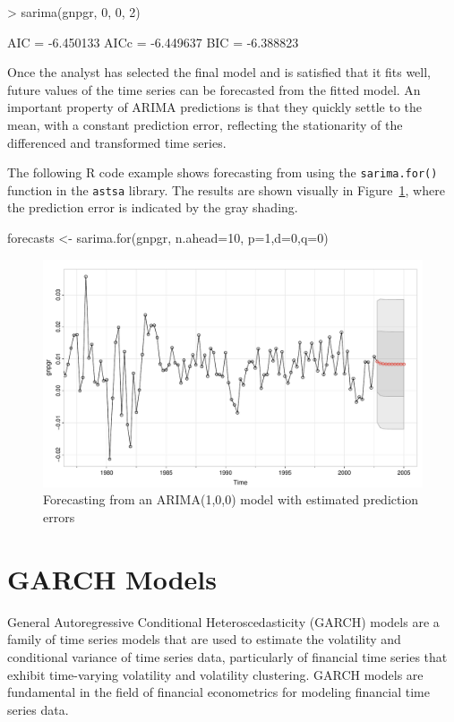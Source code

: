 \begin{samepage}
\begin{textcode}
> sarima(gnpgr, 0, 0, 2)

AIC = -6.450133  AICc = -6.449637  BIC = -6.388823 
\end{textcode}
\end{samepage}

Once the analyst has selected the final model and is satisfied that it fits well, future values of the time series can be forecasted from the fitted model. An important property of ARIMA predictions is that they quickly settle to the mean, with a constant prediction error, reflecting the stationarity of the differenced and transformed time series.

The following R code example shows forecasting from using the \texttt{sarima.for()} function in the \texttt{astsa} library. The results are shown visually in Figure~\ref{fig:figure21}, where the prediction error is indicated by the gray shading.

\begin{Rcode}
forecasts <- sarima.for(gnpgr, n.ahead=10, p=1,d=0,q=0)
\end{Rcode}

\begin{figure}
\centering
\includegraphics[width=.75\textwidth]{figure21.pdf}
\caption[Forecasting from an ARIMA(1,0,0) model]{Forecasting from an ARIMA(1,0,0) model with estimated prediction errors}
\label{fig:figure21}
\end{figure}

\section{GARCH Models}

General Autoregressive Conditional Heteroscedasticity (GARCH) models are a family of time series models that are used to estimate the volatility and conditional variance of time series data, particularly of financial time series that exhibit time-varying volatility and volatility clustering. GARCH models are fundamental in the field of financial econometrics for modeling financial time series data.

